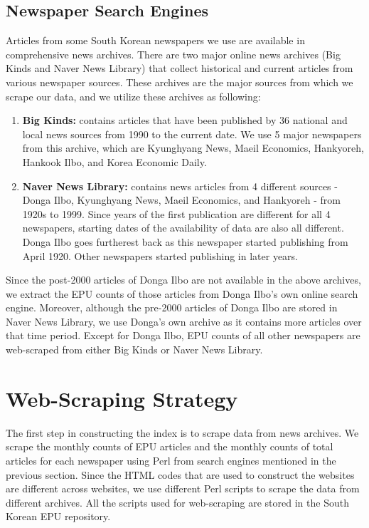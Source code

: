 \subsection{Newspaper Search Engines}
Articles from some South Korean newspapers we use are available in comprehensive news archives. There are two major online news archives (Big Kinds and Naver News Library) that collect historical and current articles from various newspaper sources. These archives are the major sources from which we scrape our data, and we utilize these archives as following:
\begin{enumerate}
\item \textbf{Big Kinds:} contains articles that have been published by 36 national and local news sources from 1990 to the current date. We use 5 major newspapers from this archive, which are Kyunghyang News, Maeil Economics, Hankyoreh, Hankook Ilbo, and Korea Economic Daily.
\item \textbf{Naver News Library:} contains news articles from 4 different sources - Donga Ilbo, Kyunghyang News, Maeil Economics, and Hankyoreh - from 1920s to 1999. Since years of the first publication are different for all 4 newspapers, starting dates of the availability of data are also all different. Donga Ilbo goes furtherest back as this newspaper started publishing from April 1920. Other newspapers started publishing in later years. 
\end{enumerate}

Since the post-2000 articles of Donga Ilbo are not available in the above archives, we extract the EPU counts of those articles from Donga Ilbo's own online search engine. Moreover, although the pre-2000 articles of Donga Ilbo are stored in Naver News Library, we use Donga's own archive as it contains more articles over that time period. Except for Donga Ilbo, EPU counts of all other newspapers are web-scraped from either Big Kinds or Naver News Library.

\section{Web-Scraping Strategy}
The first step in constructing the index is to scrape data from news archives. We scrape the monthly counts of EPU articles and the monthly counts of total articles for each newspaper using Perl from search engines mentioned in the previous section. Since the HTML codes that are used to construct the websites are different across websites, we use different Perl scripts to scrape the data from different archives. All the scripts used for web-scraping are stored in the South Korean EPU repository. 


